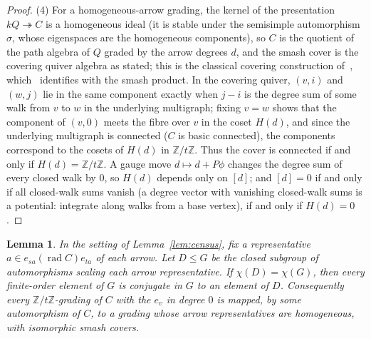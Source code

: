\documentclass[11pt]{amsart}
\theoremstyle{plain}
\newtheorem{lemma}[theorem]{Lemma}
\theoremstyle{definition}
\DeclareMathOperator{\rad}{rad}
\newcommand{\ZZ}{\mathbb{Z}}
\begin{document}
\begin{proof}
(4) For a homogeneous-arrow grading, the kernel of the presentation $kQ\twoheadrightarrow C$ is a homogeneous
ideal (it is stable under the semisimple automorphism $\sigma$, whose eigenspaces are the homogeneous
components), so $C$ is the quotient of the path algebra of $Q$ graded by the arrow degrees $d$, and the smash
cover is the covering quiver algebra as stated; this is the classical covering construction of~\cite{Green},
which~\cite{CibilsMarcos} identifies with the smash product. In the covering quiver, $(v,i)$ and $(w,j)$ lie
in the same component exactly when $j-i$ is the degree sum of some walk from $v$ to $w$ in the underlying
multigraph; fixing $v=w$ shows that the component of $(v,0)$ meets the fibre over $v$ in the coset $H(d)$, and
since the underlying multigraph is connected ($C$ is basic connected), the components correspond to the cosets
of $H(d)$ in $\ZZ/t\ZZ$. Thus the cover is connected if and only if $H(d)=\ZZ/t\ZZ$. A gauge move $d\mapsto
d+P\phi$ changes the degree sum of every closed walk by $0$, so $H(d)$ depends only on $[d]$; and $[d]=0$ if
and only if all closed-walk sums vanish (a degree vector with vanishing closed-walk sums is a potential:
integrate along walks from a base vertex), if and only if $H(d)=0$.
\end{proof}

\begin{lemma}\label{lem:diag}
In the setting of Lemma~\textup{\ref{lem:census}}, fix a representative $a\in e_{sa}(\rad C)e_{ta}$ of each
arrow. Let $D\le G$ be the closed subgroup of automorphisms scaling each arrow representative. If
$\chi(D)=\chi(G)$, then every finite-order element of $G$ is conjugate in $G$ to an element of $D$.
Consequently every $\ZZ/t\ZZ$-grading of $C$ with the $e_v$ in degree $0$ is mapped, by some automorphism of
$C$, to a grading whose arrow representatives are homogeneous, with isomorphic smash covers.
\end{lemma}
\end{document}
